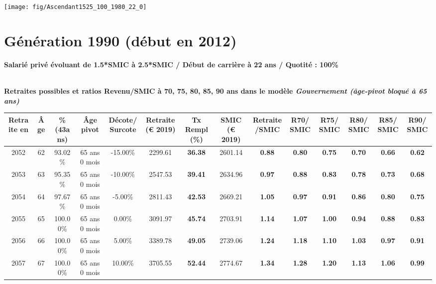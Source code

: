  {\hspace{-2.2cm}\texttt{[image: fig/Ascendant1525\_100\_1980\_22\_0]}} 

\newpage 
 
\section{Génération 1990 (début en 2012)\label{Ascendant1525_100_1990_22_0}} 
 
{\bf \noindent Salarié privé évoluant de 1.5*SMIC à 2.5*SMIC / Début de carrière à 22 ans / Quotité : 100\%}  ~ 

 ~\\{\bf \noindent Retraites possibles et ratios Revenu/SMIC à 70, 75, 80, 85, 90 ans dans le modèle \emph{Gouvernement (âge-pivot bloqué à 65 ans)}}  
 
\begin{adjustbox}{max width=\textwidth} 
\begin{tabular}[htb]{|c|c||c|c|c||c|c||c|c||c|c|c|c|c|} 
\hline 
 Retraite en &  Âge &  \%(43ans) &  Âge pivot &  Décote/Surcote &  Retraite (\euro{} 2019) &  Tx Rempl(\%) &  SMIC (\euro{} 2019) &  Retraite/SMIC &  R70/SMIC &  R75/SMIC &  R80/SMIC &  R85/SMIC &  R90/SMIC \\ 
\hline \hline 
 2052 &  62 &  93.02\% &  65 ans 0 mois &  -15.00\% &  2299.61 &  {\bf 36.38} &  2601.14 &  {\bf {\color{red} 0.88}} &  {\bf {\color{red} 0.80}} &  {\bf {\color{red} 0.75}} &  {\bf {\color{red} 0.70}} &  {\bf {\color{red} 0.66}} &  {\bf {\color{red} 0.62}} \\ 
\hline 
 2053 &  63 &  95.35\% &  65 ans 0 mois &  -10.00\% &  2547.53 &  {\bf 39.41} &  2634.96 &  {\bf {\color{red} 0.97}} &  {\bf {\color{red} 0.88}} &  {\bf {\color{red} 0.83}} &  {\bf {\color{red} 0.78}} &  {\bf {\color{red} 0.73}} &  {\bf {\color{red} 0.68}} \\ 
\hline 
 2054 &  64 &  97.67\% &  65 ans 0 mois &  -5.00\% &  2811.43 &  {\bf 42.53} &  2669.21 &  {\bf 1.05} &  {\bf {\color{red} 0.97}} &  {\bf {\color{red} 0.91}} &  {\bf {\color{red} 0.86}} &  {\bf {\color{red} 0.80}} &  {\bf {\color{red} 0.75}} \\ 
\hline 
 2055 &  65 &  100.00\% &  65 ans 0 mois &  0.00\% &  3091.97 &  {\bf 45.74} &  2703.91 &  {\bf 1.14} &  {\bf 1.07} &  {\bf 1.00} &  {\bf {\color{red} 0.94}} &  {\bf {\color{red} 0.88}} &  {\bf {\color{red} 0.83}} \\ 
\hline 
 2056 &  66 &  100.00\% &  65 ans 0 mois &  5.00\% &  3389.78 &  {\bf 49.05} &  2739.06 &  {\bf 1.24} &  {\bf 1.18} &  {\bf 1.10} &  {\bf 1.03} &  {\bf {\color{red} 0.97}} &  {\bf {\color{red} 0.91}} \\ 
\hline 
 2057 &  67 &  100.00\% &  65 ans 0 mois &  10.00\% &  3705.55 &  {\bf 52.44} &  2774.67 &  {\bf 1.34} &  {\bf 1.28} &  {\bf 1.20} &  {\bf 1.13} &  {\bf 1.06} &  {\bf {\color{red} 0.99}} \\ 
\hline 
\hline 
\end{tabular} 
\end{adjustbox} 
 
